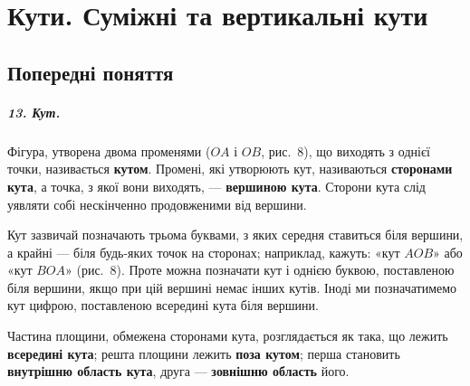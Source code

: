 \chapter{Кути. Суміжні та вертикальні кути}

\section{Попередні поняття}

\paragraph{13. Кут.}
Фігура, утворена двома променями ($OA$ і $OB$, рис.~8), що виходять з однієї точки, називається \textbf{кутом}. Промені, які утворюють кут, називаються \textbf{сторонами кута}, а точка, з якої вони виходять, — \textbf{вершиною кута}. Сторони кута слід уявляти собі нескінченно продовженими від вершини.

\begin{center}
\end{center}

Кут зазвичай позначають трьома буквами, з яких середня ставиться біля вершини, а крайні — біля будь-яких точок на сторонах; наприклад, кажуть: «кут $AOB$» або «кут $BOA$» (рис.~8). Проте можна позначати кут і однією буквою, поставленою біля вершини, якщо при цій вершині немає інших кутів. Іноді ми позначатимемо кут цифрою, поставленою всередині кута біля вершини.

Частина площини, обмежена сторонами кута, розглядається як така, що лежить \textbf{всередині кута}; решта площини лежить \textbf{поза кутом}; перша становить \textbf{внутрішню область кута}, друга — \textbf{зовнішню область} його.

